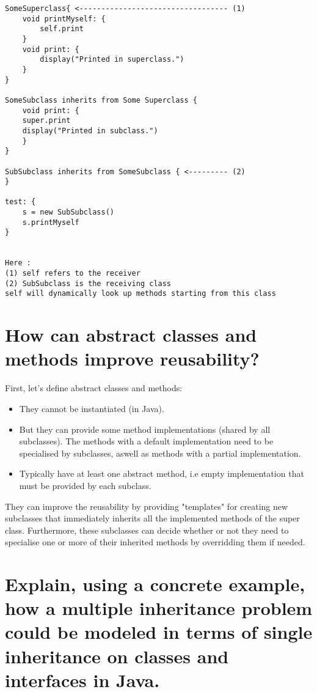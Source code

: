 \begin{itemize}
\begin{lstlisting}[caption=Pseudocode example of super calls]
\end{lstlisting}

\begin{lstlisting}[caption=Pseudocode example of self calls]
SomeSuperclass{ <---------------------------------- (1)
    void printMyself: {
		self.print
	}
    void print: {
		display("Printed in superclass.")
    }
}

SomeSubclass inherits from Some Superclass {
    void print: {
	super.print
	display("Printed in subclass.")
    }
}

SubSubclass inherits from SomeSubclass { <--------- (2)
}

test: {
	s = new SubSubclass()
	s.printMyself
}


Here :
(1) self refers to the receiver
(2) SubSubclass is the receiving class
self will dynamically look up methods starting from this class

\end{lstlisting}
\end{itemize}

\section{How can abstract classes and methods improve reusability?}

First, let's define abstract classes and methods:\\
\begin{itemize}
\item They cannot be instantiated (in Java).
\item But they can provide some method implementations (shared by all subclasses). The methods with a default implementation need to be specialised by subclasses, aswell as methods with a partial implementation.
\item Typically have at least one abstract method, i.e empty implementation that must be provided by 
each subclass.
\end{itemize}

They can improve the reusability by providing "templates" for creating new subclasses that immediately inherits all the implemented methods of the super class. Furthermore, these subclasses can decide whether or not they need to specialise one or more of their inherited methods by overridding them if needed.

\section{Explain, using a concrete example, how a multiple inheritance problem could be modeled
in terms of single inheritance on classes and interfaces in Java.}

